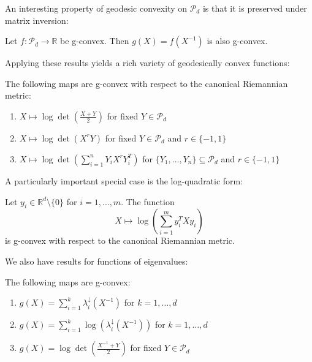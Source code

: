 An interesting property of geodesic convexity on $\mathcal{P}_d$ is that it is preserved under matrix inversion:

\begin{proposition}
Let $f: \mathcal{P}_d \rightarrow \mathbb{R}$ be g-convex. Then $g(X) = f(X^{-1})$ is also g-convex.
\end{proposition}

Applying these results yields a rich variety of geodesically convex functions:

\begin{example}
The following maps are g-convex with respect to the canonical Riemannian metric:
\begin{enumerate}
\item $X \mapsto \log \det\left(\frac{X+Y}{2}\right)$ for fixed $Y \in \mathcal{P}_d$
\item $X \mapsto \log \det(X^r Y)$ for fixed $Y \in \mathcal{P}_d$ and $r \in \{-1, 1\}$
\item $X \mapsto \log \det\left(\sum_{i=1}^n Y_i X^r Y_i^T\right)$ for $\{Y_1, \ldots, Y_n\} \subseteq \mathcal{P}_d$ and $r \in \{-1, 1\}$
\end{enumerate}
\end{example}

A particularly important special case is the log-quadratic form:

\begin{example}
Let $y_i \in \mathbb{R}^d \setminus \{0\}$ for $i = 1, \ldots, m$. The function
\begin{equation}
X \mapsto \log\left(\sum_{i=1}^m y_i^T X y_i\right)
\end{equation}
is g-convex with respect to the canonical Riemannian metric.
\end{example}

We also have results for functions of eigenvalues:

\begin{example}
The following maps are g-convex:
\begin{enumerate}
\item $g(X) = \sum_{i=1}^k \lambda_i^{\downarrow}(X^{-1})$ for $k = 1, \ldots, d$
\item $g(X) = \sum_{i=1}^k \log\left(\lambda_i^{\downarrow}(X^{-1})\right)$ for $k = 1, \ldots, d$
\item $g(X) = \log \det\left(\frac{X^{-1}+Y}{2}\right)$ for fixed $Y \in \mathcal{P}_d$
\end{enumerate}
\end{example}

